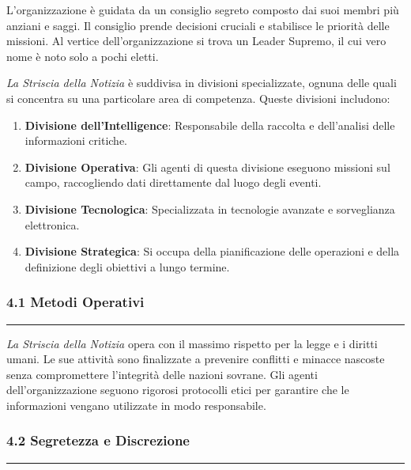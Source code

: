 L'organizzazione è guidata da un consiglio segreto composto dai suoi
membri più anziani e saggi. Il consiglio prende decisioni cruciali e
stabilisce le priorità delle missioni. Al vertice dell'organizzazione si
trova un Leader Supremo, il cui vero nome è noto solo a pochi eletti.

\emph{La Striscia della Notizia} è suddivisa in divisioni specializzate,
ognuna delle quali si concentra su una particolare area di competenza.
Queste divisioni includono:

\begin{enumerate}
\def\labelenumi{\arabic{enumi}.}
\tightlist
\item
  \textbf{Divisione dell'Intelligence}: Responsabile della raccolta e
  dell'analisi delle informazioni critiche.
\item
  \textbf{Divisione Operativa}: Gli agenti di questa divisione eseguono
  missioni sul campo, raccogliendo dati direttamente dal luogo degli
  eventi.
\item
  \textbf{Divisione Tecnologica}: Specializzata in tecnologie avanzate e
  sorveglianza elettronica.
\item
  \textbf{Divisione Strategica}: Si occupa della pianificazione delle
  operazioni e della definizione degli obiettivi a lungo termine.
\end{enumerate}

\subsubsection{4.1 Metodi Operativi}\label{metodi-operativi}

\begin{center}\rule{0.5\linewidth}{0.5pt}\end{center}

\emph{La Striscia della Notizia} opera con il massimo rispetto per la
legge e i diritti umani. Le sue attività sono finalizzate a prevenire
conflitti e minacce nascoste senza compromettere l'integrità delle
nazioni sovrane. Gli agenti dell'organizzazione seguono rigorosi
protocolli etici per garantire che le informazioni vengano utilizzate in
modo responsabile.

\subsubsection{4.2 Segretezza e
Discrezione}\label{segretezza-e-discrezione}

\begin{center}\rule{0.5\linewidth}{0.5pt}\end{center}

